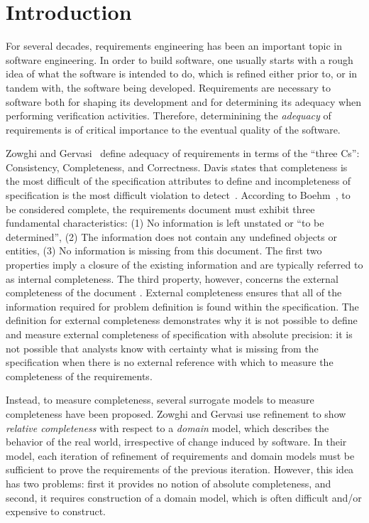 \section{Introduction}
\label{sec:intro}


For several decades, requirements engineering has been an important topic in software engineering.  In order to build software, one usually starts with a rough idea of what the software is intended to do, which is refined either prior to, or in tandem with, the software being developed.  Requirements are necessary to software both for shaping its development and for determining its adequacy when performing verification activities.  Therefore, determinining the {\em adequacy} of requirements is of critical importance to the eventual quality of the software.

Zowghi and Gervasi~\cite{} define adequacy of requirements in terms of the ``three Cs'': Consistency, Completeness, and Correctness.   Davis states that completeness is the most difficult of the specification attributes to
define and incompleteness of specification is the most difficult violation to detect~\cite{}.
According to Boehm~\cite{}, to be considered complete, the requirements document must exhibit three fundamental characteristics: (1) No information is left unstated or ``to be determined'', (2) The information does not contain any undefined objects or entities, (3) No information is missing from this document. The first two properties imply a closure of the existing information and are typically referred to as internal completeness.  The third property, however, concerns the external completeness of the document
\cite{}. External completeness ensures that all of the information required for problem definition is found within the specification.   The definition for external completeness demonstrates why it is not possible to define and measure external completeness of specification with absolute precision: it is not possible that analysts know with certainty what is missing from the specification when there is no external reference with which to measure the completeness of the requirements.

Instead, to measure completeness, several surrogate models to measure completeness have been proposed.  Zowghi and Gervasi use refinement to show {\em relative completeness} with respect to a {\em domain} model, which describes the behavior of the real world, irrespective of change induced by software.  In their model, each iteration of refinement of requirements and domain models must be sufficient to prove the requirements of the previous iteration.  However, this idea has two problems: first it provides no notion of absolute completeness, and second, it requires construction of a domain model, which is often difficult and/or expensive to construct.

